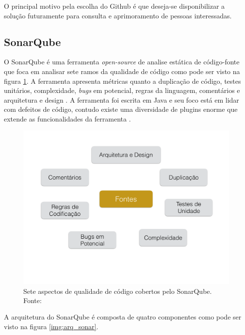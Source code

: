O principal motivo pela escolha do Github é que deseja-se disponibilizar a solução futuramente para consulta e aprimoramento de pessoas interessadas. 		

	\subsection{SonarQube}
	\label{sub:sonarqube}
	O SonarQube é uma ferramenta \textit{open-source} de analise estática de código-fonte que foca em analisar sete ramos da qualidade de código como pode ser visto na figura \ref{img:sonar}. A ferramenta apresenta métricas quanto a duplicação de código, testes unitários, complexidade, \textit{bugs} em potencial, regras da linguagem, comentários e arquitetura e design \cite{sonar}. A ferramenta foi escrita em Java e seu foco está em lidar com defeitos de código, contudo existe uma diversidade de plugins enorme que extende as funcionalidades da ferramenta \cite{ferenc_source_2014}.
\graphicspath{{figuras/}}
\begin{figure}[h]
\centering
\includegraphics[scale=0.5]{Sonar}
\caption{Sete  aspectos de qualidade de código cobertos pelo SonarQube. Fonte: \cite{sonar}}
\label{img:sonar}
\end{figure}
A arquitetura do SonarQube é composta de quatro componentes como pode ser visto na figura \ref{img:arq_sonar}\cite{sonar}.
